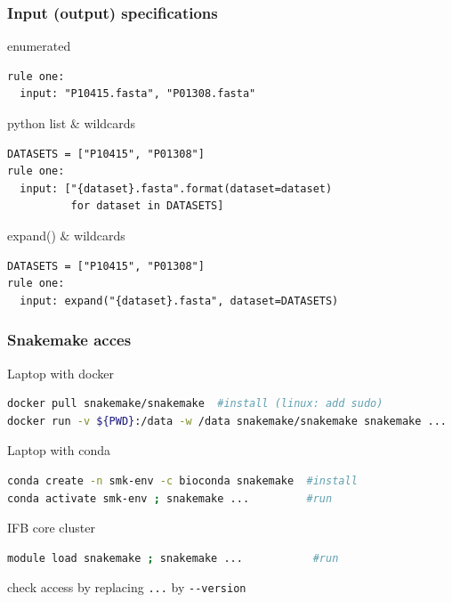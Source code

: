 \begin{frame}[containsverbatim]
\frametitle{Input (output) specifications}
\begin{block}{enumerated}
\begin{lstlisting}
rule one:
  input: "P10415.fasta", "P01308.fasta"
\end{lstlisting}
\end{block}
\begin{block}{python list $\&$ wildcards}
\begin{lstlisting}
DATASETS = ["P10415", "P01308"]
rule one: 
  input: ["{dataset}.fasta".format(dataset=dataset) 
          for dataset in DATASETS] 
\end{lstlisting}
\end{block}
\begin{block}{expand() $\&$ wildcards}
\begin{lstlisting}
DATASETS = ["P10415", "P01308"]
rule one: 
  input: expand("{dataset}.fasta", dataset=DATASETS) 
\end{lstlisting}
\end{block}
\end{frame}
\begin{frame}[containsverbatim]
\frametitle{Snakemake acces}
\begin{block}{Laptop with docker}
\begin{lstlisting}[language=bash]
docker pull snakemake/snakemake  #install (linux: add sudo)
docker run -v ${PWD}:/data -w /data snakemake/snakemake snakemake ...  #run
\end{lstlisting}
\end{block}
\begin{block}{Laptop with conda}
\begin{lstlisting}[language=bash]
conda create -n smk-env -c bioconda snakemake  #install
conda activate smk-env ; snakemake ...         #run
\end{lstlisting}
\end{block}
\begin{block}{IFB core cluster}
\begin{lstlisting}[language=bash]
module load snakemake ; snakemake ...           #run
\end{lstlisting}
\end{block}
check access by replacing \verb|...| by \verb|--version|
\end{frame}